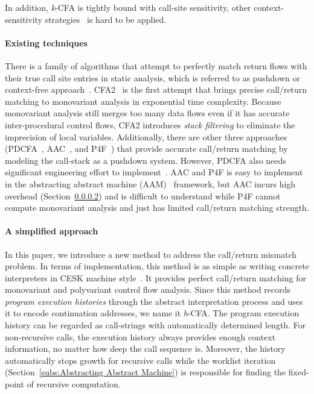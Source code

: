 \documentclass[12pt]{report}
\begin{document}
In addition, \textit{k}-CFA is tightly bound with call-site sensitivity, other context-sensitivity strategies~\cite{agesen1995cartesian, milanova2005parameterized,smaragdakis2011pick, lhotak2003scaling, wright1998polymorphic} is hard to be applied.

\paragraph{Existing techniques}
There is a family of algorithms that attempt to perfectly match return flows with their true call site entries in static analysis, which is referred to as pushdown or context-free approach~\cite{reps1995precise, sagiv1996precise}.
CFA2~\cite{vardoulakis2010cfa2} is the first attempt that brings precise call/return matching to monovariant analysis in exponential time complexity.
Because monovariant analysis still merges too many data flows even if it has accurate inter-procedural control flows, CFA2 introduces \emph{stack filtering} to eliminate the imprecision of local variables.
Additionally, there are other three approaches (PDCFA~\cite{earl2010pushdown}, AAC~\cite{johnson2015abstracting}, and P4F~\cite{gilray2016pushdown}) that provide accurate call/return matching by modeling the call-stack as a pushdown system.
However, PDCFA also needs significant engineering effort to implement~\cite{gilray2016pushdown}.
AAC and P4F is easy to implement in the abstracting abstract machine (AAM)~\cite{van2010abstracting} framework, but AAC incurs high overhead (Section~\ref{}) and is difficult to understand while P4F cannot compute monovariant analysis and just has limited call/return matching strength.

\paragraph{A simplified approach}
In this paper, we introduce a new method to address the call/return mismatch problem.
In terms of implementation, this method is as simple as writing concrete interpreters in CESK machine style~\cite{felleisen1987calculus}.
It provides perfect call/return matching for monovariant and polyvariant control flow analysis.
Since this method records \emph{program execution histories} through the abstract interpretation process and uses it to encode continuation addresses, we name it \textit{h}-CFA\@.
The program execution history can be regarded as call-strings with automatically determined length.
For non-recursive calls, the execution history always provides enough context information, no matter how deep the call sequence is.
Moreover, the history automatically stops growth for recursive calls while the worklist iteration (Section~\ref{subs:Abstracting Abstract Machine}) is responsible for finding the fixed-point of recursive computation.
\end{document}
